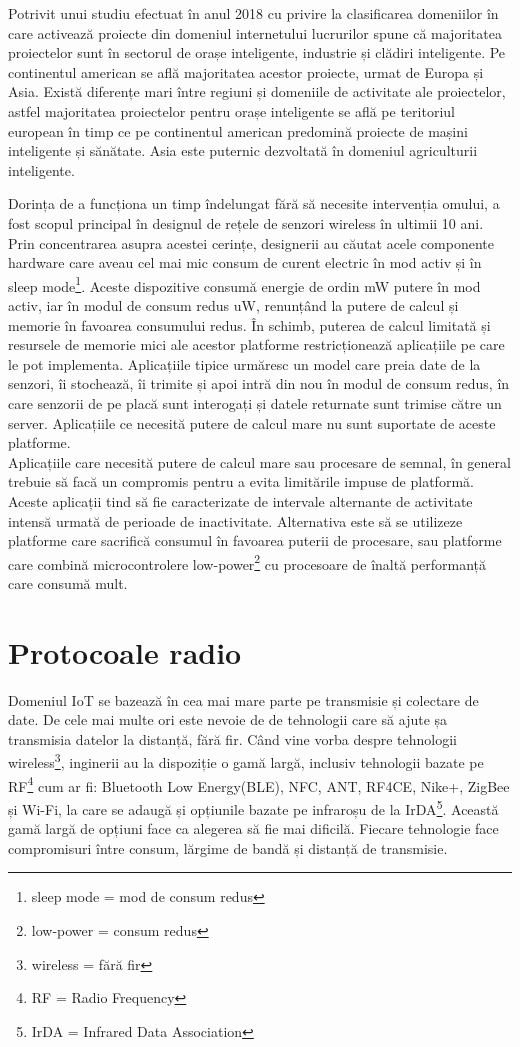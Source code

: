 \documentclass[12pt,a4paper]{report}
\begin{document}
Potrivit unui studiu efectuat în anul 2018 cu privire la clasificarea domeniilor în care activează proiecte din domeniul internetului lucrurilor spune că majoritatea proiectelor sunt în sectorul de orașe inteligente, industrie și clădiri inteligente\cite{study}. Pe continentul american se află majoritatea acestor proiecte, urmat de Europa și Asia. Există diferențe mari între regiuni și domeniile de activitate ale proiectelor, astfel majoritatea proiectelor pentru orașe inteligente se află pe teritoriul european în timp ce pe continentul american predomină proiecte de mașini inteligente și sănătate. Asia este puternic dezvoltată în domeniul agriculturii inteligente.

Dorința de a funcționa un timp îndelungat fără să necesite intervenția omului, a fost scopul principal în designul de rețele de senzori wireless în ultimii 10 ani\cite{lowpowervsperformance}. Prin concentrarea asupra acestei cerințe, designerii au căutat acele componente hardware care aveau cel mai mic consum de curent electric în mod activ și în sleep mode\footnote{sleep mode = mod de consum redus}. Aceste dispozitive consumă energie de ordin mW putere în mod activ, iar în modul de consum redus uW, renunțând la putere de calcul și memorie în favoarea consumului redus.
În schimb, puterea de calcul limitată și resursele de memorie mici ale acestor platforme restricționează aplicațiile pe care le pot implementa. Aplicațiile tipice urmăresc un model care preia date de la senzori, îi stochează, îi trimite și apoi intră din nou în modul de consum redus, în care senzorii de pe placă sunt interogați și datele returnate sunt trimise către un server. Aplicațiile ce necesită putere de calcul mare nu sunt suportate de aceste platforme. \\
Aplicațiile care necesită putere de calcul mare sau procesare de semnal, în general trebuie să facă un compromis pentru a evita limitările impuse de platformă. Aceste aplicații tind să fie caracterizate de intervale alternante de activitate intensă urmată de perioade de inactivitate. Alternativa este să se utilizeze platforme care sacrifică consumul în favoarea puterii de procesare, sau platforme care combină microcontrolere low-power\footnote{low-power = consum redus} cu procesoare de înaltă performanță care consumă mult.

\section{Protocoale radio}
Domeniul IoT se bazează în cea mai mare parte pe transmisie și colectare de date. De cele mai multe ori este nevoie de de tehnologii care să ajute șa transmisia datelor la distanță, fără fir.
Când vine vorba despre tehnologii wireless\footnote{wireless = fără fir}, inginerii au la dispoziție o gamă largă, inclusiv tehnologii bazate pe RF\footnote{RF = Radio Frequency} cum ar fi: Bluetooth Low Energy(BLE), NFC, ANT, RF4CE, Nike+, ZigBee și Wi-Fi, la care se adaugă și opțiunile bazate pe infraroșu de la IrDA\footnote{IrDA = Infrared Data Association}\cite{comp1}. Această gamă largă de opțiuni face ca alegerea să fie mai dificilă. Fiecare tehnologie face compromisuri între consum, lărgime de bandă și distanță de transmisie.
\end{document}
